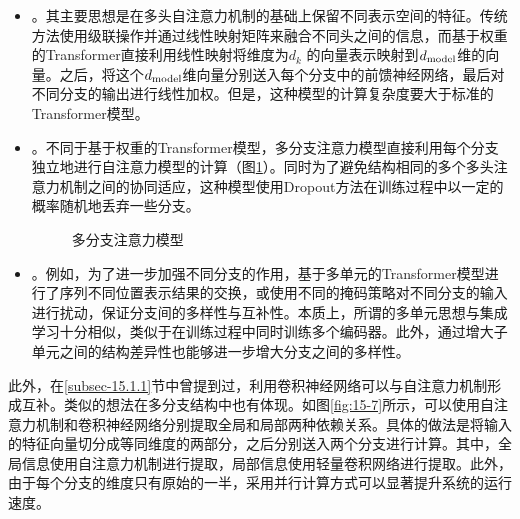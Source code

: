 \begin{itemize}
\vspace{0.5em}
\item {\small{}}。其主要思想是在多头自注意力机制的基础上保留不同表示空间的特征。传统方法使用级联操作并通过线性映射矩阵来融合不同头之间的信息，而基于权重的Transformer直接利用线性映射将维度为$d_k$ 的向量表示映射到$d_{\rm model}$维的向量。之后，将这个$d_{\rm model}$维向量分别送入每个分支中的前馈神经网络，最后对不同分支的输出进行线性加权。但是，这种模型的计算复杂度要大于标准的Transformer模型。
\vspace{0.5em}
\item {\small{}}。不同于基于权重的Transformer模型，多分支注意力模型直接利用每个分支独立地进行自注意力模型的计算（图\ref{fig:15-6}）。同时为了避免结构相同的多个多头注意力机制之间的协同适应，这种模型使用Dropout方法在训练过程中以一定的概率随机地丢弃一些分支。

\begin{figure}[htp]
\centering

\caption{多分支注意力模型}
\label{fig:15-6}
\end{figure}

\vspace{0.5em}
\item {\small{}}。例如，为了进一步加强不同分支的作用，基于多单元的Transformer模型进行了序列不同位置表示结果的交换，或使用不同的掩码策略对不同分支的输入进行扰动，保证分支间的多样性与互补性。本质上，所谓的多单元思想与集成学习十分相似，类似于在训练过程中同时训练多个编码器。此外，通过增大子单元之间的结构差异性也能够进一步增大分支之间的多样性。
\vspace{0.5em}
\end{itemize}

\parinterval 此外，在\ref{subsec-15.1.1}节中曾提到过，利用卷积神经网络可以与自注意力机制形成互补。类似的想法在多分支结构中也有体现。如图\ref{fig:15-7}所示，可以使用自注意力机制和卷积神经网络分别提取全局和局部两种依赖关系。具体的做法是将输入的特征向量切分成等同维度的两部分，之后分别送入两个分支进行计算。其中，全局信息使用自注意力机制进行提取，局部信息使用轻量卷积网络进行提取。此外，由于每个分支的维度只有原始的一半，采用并行计算方式可以显著提升系统的运行速度。

